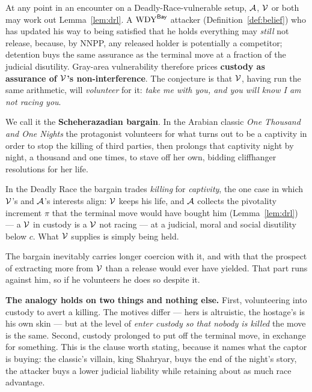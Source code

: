 \begin{remark}\label{rem:scheherazade}
At any point in an encounter on a Deadly-Race-vulnerable setup, $\mathcal{A}$,
$\mathcal{V}$ or both may work out Lemma~\ref{lem:drl}. A $\mathrm{WDY}^{\mathsf{Bay}}$ attacker
(Definition~\ref{def:belief}) who has updated his way to being satisfied that he
holds everything may \emph{still} not release, because, by NNPP, any released holder
is potentially a competitor; detention buys the same assurance as the terminal
move at a fraction of the judicial disutility. Gray-area vulnerability
therefore prices \textbf{custody
as assurance of $\mathcal{V}$'s non-interference}. The conjecture is that $\mathcal{V}$,
having run the same arithmetic, will \emph{volunteer} for it: \emph{take me with
you, and you will know I am not racing you}.

We call it the \textbf{Scheherazadian bargain}. In the Arabian classic
\emph{One Thousand and One Nights} the protagonist volunteers for what turns
out to be a captivity in order to stop the killing of third parties, then prolongs that
captivity night by night, a thousand and one times, to stave off her own, bidding
cliffhanger resolutions for her life.

In the Deadly Race the bargain trades \emph{killing} for \emph{captivity}, the
one case in which $\mathcal{V}$'s and $\mathcal{A}$'s interests align: $\mathcal{V}$ keeps
his life, and $\mathcal{A}$ collects the pivotality increment $\pi$ that the
terminal move would have bought him (Lemma~\ref{lem:drl}) --- a $\mathcal{V}$ in
custody is a $\mathcal{V}$ not racing --- at a judicial, moral and social disutility
below $c$. What $\mathcal{V}$ supplies is simply being held.

The bargain inevitably carries longer coercion with it, and with that the
prospect of extracting more from $\mathcal{V}$ than a release would ever have
yielded. That part runs against him, so if he volunteers he does so despite it.

\medskip\noindent\textbf{The analogy holds on two things and nothing else.}
First, volunteering into custody to avert a killing. The motives differ --- hers
is altruistic, the hostage's is his own skin --- but at the level of \emph{enter
custody so that nobody is killed} the move is the same. Second, custody
prolonged to put off the terminal move, in exchange for something. This is the
clause worth stating, because it
names what the captor is buying: the classic's villain, king Shahryar, buys the end
of the night's story, the attacker buys a lower judicial liability while retaining
about as much race advantage.


\end{remark}
